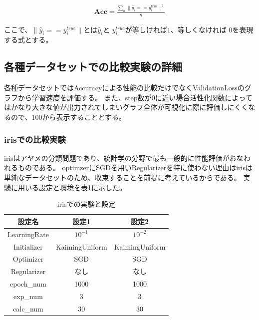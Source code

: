 \begin{eqnarray}
\mathbf{Acc} = \frac{\sum_n \| \hat{y}_i == y_i^{true}\|^2}{n}
\label{eq:accuracy}
\end{eqnarray}

ここで、$ \| \hat{y}_i == y_i^{true}\| $とは$ \hat{y}_i $と $ y_i^{true} $が等しければ$ 1 $、等しくなければ $ 0 $を表現する式とする。

\subsection{各種データセットでの比較実験の詳細}

各種データセットではAccuracyによる性能の比較だけでなくValidationLossのグラフから学習速度を評価する。
また、step数が$0$に近い場合活性化関数によってはかなり大きな値が出力されてしまいグラフ全体が可視化に際に評価しにくくなるので、$100$から表示することとする。

\subsubsection{irisでの比較実験}
\label{impl:iris}

irisはアヤメの分類問題であり、統計学の分野で最も一般的に性能評価がおなわれるものである。
optimzerにSGDを用いRegularizerを特に使わない理由はirisは単純なデータセットのため、収束することを前提に考えているからである。
実験に用いる設定と環境を表\ref{exp:iris}に示した。


\begin{table}[htbp]
\label{exp:iris}
    \begin{center}
        \caption{irisでの実験と設定}
        \label{exp:iris}
        \vspace{2mm} 
        \begin{tabular}{ |c|c|c| }
        \hline
        設定名 & 設定1 & 設定2 \\
        \hline
        LearningRate         & $ 10^{-1} $ & $ 10^{-2} $ \\
        \hline
        Initializer       & KaimingUniform &  KaimingUniform \\
        \hline
        Optimizer           & SGD & SGD \\
        \hline
        Regularizer     & なし & なし \\
        \hline
        epoch\_num       & 1000 &  1000 \\
        \hline
        exp\_num         & 3 & 3 \\
        \hline
        calc\_num        & 30 & 30 \\
        \hline
        \end{tabular}
    \end{center}
\end{table}



